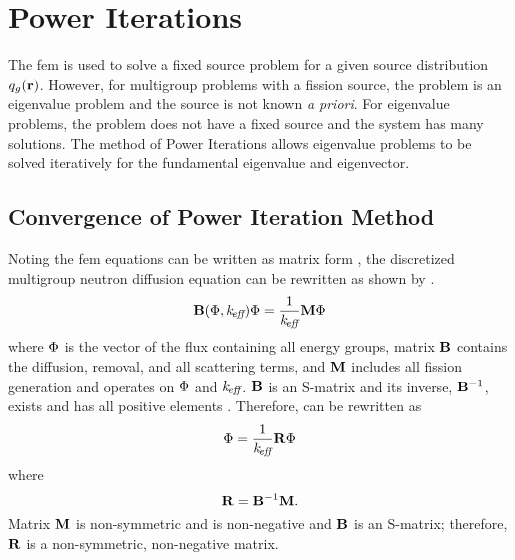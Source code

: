 \section{Power Iterations}
  \label{sec:power_iterations}
  The \gls{fem} is used to solve a fixed source problem for a given source
  distribution $q_g(\mathbf{r})$. However, for multigroup problems with a fission
  source, the problem is an eigenvalue problem and the source is not known
  \textit{a priori}. For eigenvalue problems, the problem does not have a fixed
  source and the system has many solutions. The method of Power Iterations
  allows eigenvalue problems to be solved iteratively for the fundamental
  eigenvalue and eigenvector.

  \subsection{Convergence of Power Iteration Method}
    Noting the \gls{fem} equations can be written as matrix form
    , the discretized multigroup neutron diffusion 
    equation can be rewritten as shown by \textcite{gehinThesis}.
    \begin{equation}
      \label{eq:gehin_notation}
      \mathbf{B}(\Phi,k_{\!\mbox{\scriptsize \em eff}}) \Phi = \frac{1}{k_{\!\mbox{\scriptsize \em eff}}} \mathbf{M} \Phi
    \end{equation}
    where $\Phi$ is the vector of the flux containing all energy groups, matrix 
    $\mathbf{B}$ contains the diffusion, removal, and all scattering terms, and $\mathbf{M}$ 
    includes all fission generation and operates on $\Phi$ and $k_{\!\mbox{\scriptsize \em eff}}$. $\mathbf{B}$
    is an S-matrix and its inverse, $\mathbf{B}^{-1}$, exists and has all positive 
    elements \cite{nakamura}. Therefore,  can be 
    rewritten as
    \begin{equation}
      \label{eq:gehin_solution}
      \Phi = \frac{1}{k_{\!\mbox{\scriptsize \em eff}}} \mathbf{R} \Phi
    \end{equation}
    where
    \begin{equation}
      \label{eq:gehin_r}
      \mathbf{R} = \mathbf{B}^{-1} \mathbf{M}.
    \end{equation}
    Matrix $\mathbf{M}$ is non-symmetric and is non-negative and $\mathbf{B}$ is an S-matrix;
    therefore, $\mathbf{R}$ is a non-symmetric, non-negative matrix.

